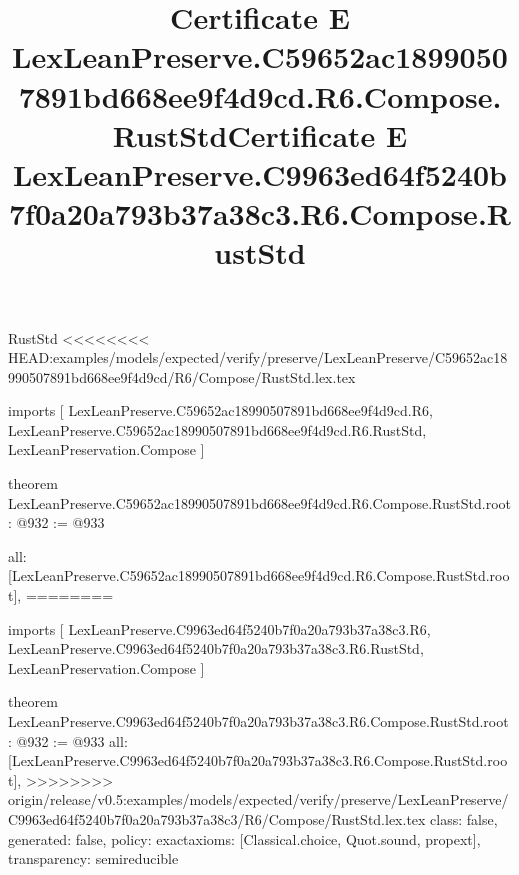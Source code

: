 \begin{lexlean}{RustStd}
<<<<<<<< HEAD:examples/models/expected/verify/preserve/LexLeanPreserve/C59652ac18990507891bd668ee9f4d9cd/R6/Compose/RustStd.lex.tex
\title{Certificate E LexLeanPreserve.C59652ac18990507891bd668ee9f4d9cd.R6.Compose.RustStd}
\begin{coremodule}
imports [
  LexLeanPreserve.C59652ac18990507891bd668ee9f4d9cd.R6,
  LexLeanPreserve.C59652ac18990507891bd668ee9f4d9cd.R6.RustStd,
  LexLeanPreservation.Compose
]

theorem LexLeanPreserve.C59652ac18990507891bd668ee9f4d9cd.R6.Compose.RustStd.root : @932 := @933 {
  all: [LexLeanPreserve.C59652ac18990507891bd668ee9f4d9cd.R6.Compose.RustStd.root],
========
\title{Certificate E LexLeanPreserve.C9963ed64f5240b7f0a20a793b37a38c3.R6.Compose.RustStd}
\begin{coremodule}
imports [
  LexLeanPreserve.C9963ed64f5240b7f0a20a793b37a38c3.R6,
  LexLeanPreserve.C9963ed64f5240b7f0a20a793b37a38c3.R6.RustStd,
  LexLeanPreservation.Compose
]

theorem LexLeanPreserve.C9963ed64f5240b7f0a20a793b37a38c3.R6.Compose.RustStd.root : @932 := @933 {
  all: [LexLeanPreserve.C9963ed64f5240b7f0a20a793b37a38c3.R6.Compose.RustStd.root],
>>>>>>>> origin/release/v0.5:examples/models/expected/verify/preserve/LexLeanPreserve/C9963ed64f5240b7f0a20a793b37a38c3/R6/Compose/RustStd.lex.tex
  class: false,
  generated: false,
  policy: exact{axioms: [Classical.choice, Quot.sound, propext]},
  transparency: semireducible
}


\end{coremodule}}
\end{coremodule}
\end{lexlean}
